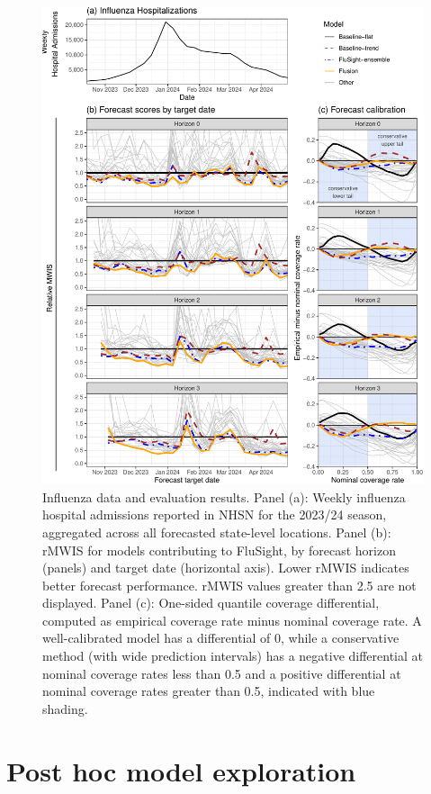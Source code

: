 \documentclass{article}\usepackage[]{graphicx}\usepackage[]{xcolor}
\begin{document}
\begin{figure}[hpt]
    \centering
    \includegraphics[width=\textwidth]{../artifacts/figures/scores_flusight.pdf}
    \caption{Influenza data and evaluation results. Panel (a): Weekly influenza hospital admissions reported in NHSN for the 2023/24 season, aggregated across all forecasted state-level locations. Panel (b): rMWIS for models contributing to FluSight, by forecast horizon (panels) and target date (horizontal axis). Lower rMWIS indicates better forecast performance. rMWIS values greater than 2.5 are not displayed. Panel (c): One-sided quantile coverage differential, computed as empirical coverage rate minus nominal coverage rate. A well-calibrated model has a differential of 0, while a conservative method (with wide prediction intervals) has a negative differential at nominal coverage rates less than 0.5 and a positive differential at nominal coverage rates greater than 0.5, indicated with blue shading.}
    \label{fig:scores_flusight}
\end{figure}

\section{Post hoc model exploration}
\label{sec:post-hoc-results}
\end{document}
